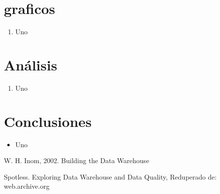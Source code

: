 \documentclass[twoside,twocolumn]{article}
\begin{document}

\section{graficos}
\begin{enumerate}

 \item Uno
   
\end{enumerate}


\section{Análisis}

\begin{enumerate}

    \item Uno
\end{enumerate}


\section{Conclusiones}
\begin{itemize}	
 \item Uno

\end{itemize} 





\begin{thebibliography}{99} 

\bibitem[1]{}
\newblock W. H. Inom, 2002. Building the Data Warehouse

\bibitem[2]{}
\newblock Spotless. Exploring Data Warehouse and Data Quality, Reduperado de: web.archive.org


\end{thebibliography}


\end{document}
